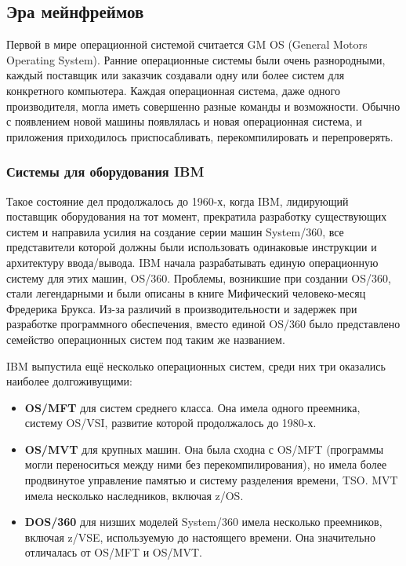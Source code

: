 \subsection{Эра мейнфреймов}\label{base:os:history:mainframe}
Первой в мире операционной системой считается GM OS (General Motors Operating System).
Ранние операционные системы были очень разнородными, каждый поставщик или заказчик создавали одну или более систем для конкретного компьютера. Каждая операционная система, даже одного производителя, могла иметь совершенно разные команды и возможности. Обычно с появлением новой машины появлялась и новая операционная система, и приложения приходилось приспосабливать, перекомпилировать и перепроверять.

\subsubsection{Системы для оборудования IBM}\label{base:os:history:ibm}
Такое состояние дел продолжалось до 1960-х, когда IBM, лидирующий поставщик оборудования на тот момент, прекратила разработку существующих систем и направила усилия на создание серии машин System/360, все представители которой должны были использовать одинаковые инструкции и архитектуру ввода/вывода. IBM начала разрабатывать единую операционную систему для этих машин, OS/360. Проблемы, возникшие при создании OS/360, стали легендарными и были описаны в книге Мифический человеко-месяц Фредерика Брукса. Из-за различий в производительности и задержек при разработке программного обеспечения, вместо единой OS/360 было представлено семейство операционных систем под таким же названием.

IBM выпустила ещё несколько операционных систем, среди них три оказались наиболее долгоживущими:
\begin{itemize}
 \item \textbf{OS/MFT} для систем среднего класса. Она имела одного преемника, систему OS/VSI, развитие которой продолжалось до 1980-х.
 \item \textbf{OS/MVT} для крупных машин. Она была сходна с OS/MFT (программы могли переноситься между ними без перекомпилирования), но имела более продвинутое управление памятью и систему разделения времени, TSO. MVT имела несколько наследников, включая z/OS.
 \item \textbf{DOS/360} для низших моделей System/360 имела несколько преемников, включая z/VSE, используемую до настоящего времени. Она значительно отличалась от OS/MFT и OS/MVT.
\end{itemize}

